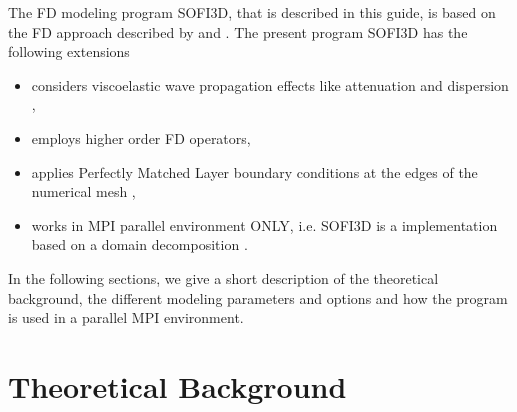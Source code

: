 \documentclass[11pt,onecolumn,oneside]{article}
\begin{document}
The FD modeling program SOFI3D, that is described in this guide, is based on the FD approach described by \cite{virieux:86} and \cite{levander:88}. The present program SOFI3D has the following extensions

\begin{itemize}
\item considers viscoelastic wave propagation effects like attenuation and dispersion \\
\cite{robertsson:94,blanch:95,bohlen:02},
\item employs higher order FD operators,
\item applies Perfectly Matched Layer boundary conditions at the edges of the numerical mesh \cite{komatitsch:07},
\item works in MPI parallel environment ONLY, i.e. SOFI3D is a implementation based on a domain decomposition
\cite{bohlen:02}.
\end{itemize}

In the following sections, we give a short description of the  theoretical background, the different modeling parameters and options and how the program is used in a parallel MPI environment.
                       
\newpage
\section{Theoretical Background}
\end{document}
